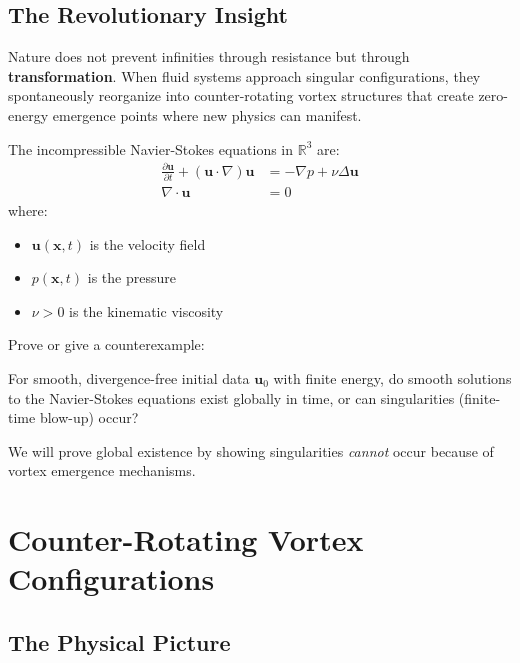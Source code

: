 \subsection{The Revolutionary Insight}

\begin{keyidea}
Nature does not prevent infinities through resistance but through \textbf{transformation}. When fluid systems approach singular configurations, they spontaneously reorganize into counter-rotating vortex structures that create zero-energy emergence points where new physics can manifest.
\end{keyidea}

\begin{defn}\label{def:navier-stokes}
The incompressible Navier-Stokes equations in $\mathbb{R}^3$ are\cite{temam2001,fefferman2000}:
\begin{align}
\frac{\partial \mathbf{u}}{\partial t} + (\mathbf{u} \cdot \nabla)\mathbf{u} &= -\nabla p + \nu \Delta \mathbf{u} \\
\nabla \cdot \mathbf{u} &= 0
\end{align}
where:
\begin{itemize}
\item $\mathbf{u}(\mathbf{x}, t)$ is the velocity field
\item $p(\mathbf{x}, t)$ is the pressure
\item $\nu > 0$ is the kinematic viscosity
\end{itemize}
\end{defn}

\begin{theorem}\label{thm:millennium-ns}
Prove or give a counterexample:

For smooth, divergence-free initial data $\mathbf{u}_0$ with finite energy, do smooth solutions to the Navier-Stokes equations exist globally in time, or can singularities (finite-time blow-up) occur?
\end{theorem}

We will prove global existence by showing singularities \textit{cannot} occur because of vortex emergence mechanisms.

\section{Counter-Rotating Vortex Configurations}

\subsection{The Physical Picture}

